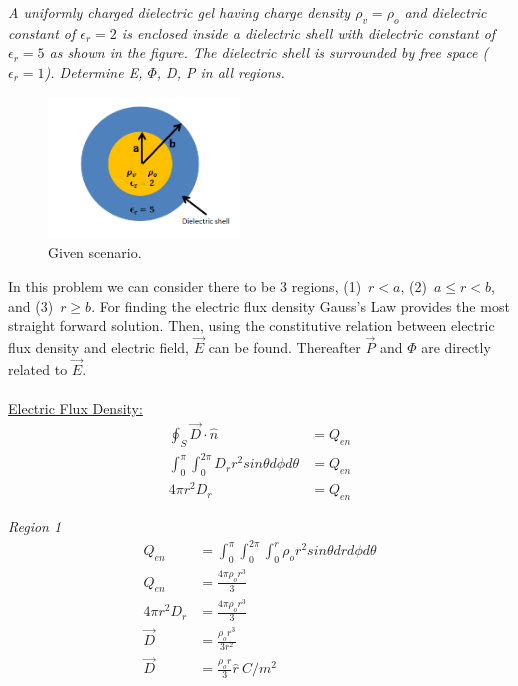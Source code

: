 \documentclass[12pt]{article}
\begin{document}
\noindent \textit{A uniformly charged dielectric gel having charge density $\rho_v = \rho_o$ and dielectric constant of $\epsilon_r = 2$ is enclosed inside a dielectric shell with dielectric constant of $\epsilon_r = 5$ as shown in the figure. The dielectric shell is surrounded by free space ($\epsilon_r = 1$). Determine E, $\Phi$, D, P in all regions.}

\begin{figure}[!h] 
	\begin{centering}
		\includegraphics[keepaspectratio = true, width = 2in]{image.PNG}
		\caption{Given scenario.}
	\end{centering}
\end{figure}

\noindent In this problem we can consider there to be 3 regions, (1)~$r < a$, (2)~$a \leq r < b$, and (3)~$r \geq b$. For finding the electric flux density Gauss's Law provides the most straight forward solution. Then, using the constitutive relation between electric flux density and electric field, $\vec{E}$ can be found. Thereafter $\vec{P}$ and $\Phi$ are directly related to $\vec{E}$.\\
\\
\underline{Electric Flux Density:}
	\begin{align*}
		\oint_S \vec{D} \cdot \hat{n} &= Q_{en} \\
		\int_0^\pi \int_0^{2\pi} D_r r^2 sin\theta d\phi d\theta &= Q_{en}\\	
		4\pi r^2 D_r &= Q_{en}
	\end{align*}

\textit{Region 1}			
	\begin{align*}
		Q_{en} &= \int_0^\pi \int_0^{2\pi} \int_0^r \rho_o r^2 sin\theta dr d\phi d\theta \\	
		Q_{en} &= \frac{4\pi \rho_o r^3}{3} \\
		4\pi r^2 D_r &= \frac{4\pi \rho_o r^3}{3} \\
		\vec{D} &= \frac{\rho_o r^3}{3 r^2} \\
		\vec{D} &= \frac{\rho_o r}{3} \hat{r}~C/m^2
	\end{align*}
	
\end{document}
